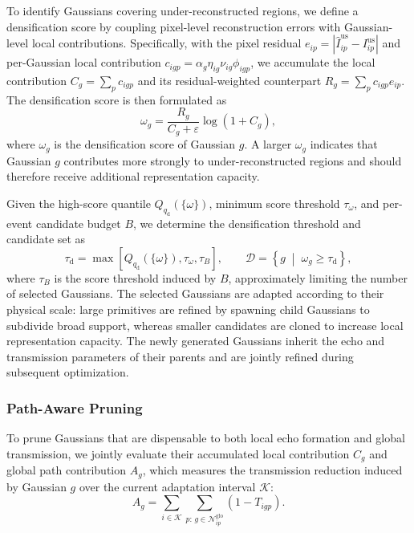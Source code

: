 To identify Gaussians covering under-reconstructed regions, we define a
densification score by coupling pixel-level reconstruction errors with
Gaussian-level local contributions. Specifically, with the pixel residual
$e_{ip}
=
|\widehat I^{\mathrm{us}}_{ip}-I^{\mathrm{us}}_{ip}|$
and per-Gaussian local contribution
$c_{igp}
=
\alpha_g\eta_{ig}\nu_{ig}\phi_{igp}$,
we accumulate the local contribution
$C_g=\sum_p c_{igp}$ and its residual-weighted counterpart
$R_g=\sum_p c_{igp}e_{ip}$. The densification score is then formulated as
\begin{equation}
\omega_g
=
\frac{R_g}{C_g+\varepsilon}
\log(1+C_g),
\label{eq:contribution-aware-densification}
\end{equation}
where $\omega_g$ is the densification score of Gaussian $g$.
A larger $\omega_g$ indicates that Gaussian $g$ contributes more strongly to
under-reconstructed regions and should therefore receive additional
representation capacity.

Given the high-score quantile $Q_{q_{\mathrm d}}(\{\omega\})$, minimum score
threshold $\tau_{\omega}$, and per-event candidate budget $B$, we determine
the densification threshold and candidate set as
\begin{equation}
\tau_{\mathrm d}
=
\max
\left[
Q_{q_{\mathrm d}}(\{\omega\}),
\tau_{\omega},
\tau_{B}
\right],
\qquad
\mathcal D
=
\left\{
g
\;\middle|\;
\omega_g\geq\tau_{\mathrm d}
\right\},
\label{eq:densification-selection}
\end{equation}
where $\tau_B$ is the score threshold induced by $B$, approximately limiting
the number of selected Gaussians. The selected Gaussians are adapted according
to their physical scale: large primitives are refined by spawning child
Gaussians to subdivide broad support, whereas smaller candidates are cloned to
increase local representation capacity. The newly generated Gaussians inherit
the echo and transmission parameters of their parents and are jointly refined
during subsequent optimization.

\subsubsection{Path-Aware Pruning}

To prune Gaussians that are dispensable to both local echo formation and
global transmission, we jointly evaluate their accumulated local contribution
$C_g$ and global path contribution $A_g$, which measures the transmission
reduction induced by Gaussian $g$ over the current adaptation interval
$\mathcal K$:
\begin{equation}
A_g
=
\sum_{i\in\mathcal K}
\sum_{p:\,g\in\mathcal N^{\mathrm{glo}}_{ip}}
\left(
1-T_{igp}
\right).
\label{eq:global-path-contribution}
\end{equation}

